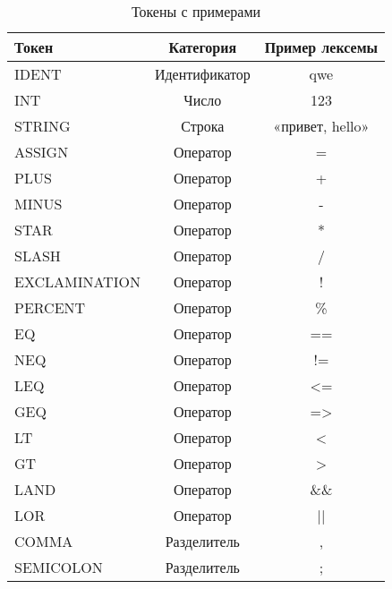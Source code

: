 \begin{table}[h!]
    \Large
    \caption{Токены с примерами}
    \label{t:tokens}
    \centering
    \begin{tabularx}{\textwidth}{|X|c|c|}
        \hline
        Токен         & Категория      & Пример лексемы  \\
        \hline
        IDENT         & Идентификатор  & qwe             \\
        \hline
        INT           & Число          & 123             \\
        \hline
        STRING        & Строка         & «привет, hello» \\
        \hline
        ASSIGN        & Оператор       & =               \\
        \hline
        PLUS          & Оператор       & +               \\
        \hline
        MINUS         & Оператор       & -               \\
        \hline
        STAR          & Оператор       & *               \\
        \hline
        SLASH         & Оператор       & /               \\
        \hline
        EXCLAMINATION & Оператор       & !               \\
        \hline
        PERCENT       & Оператор       & \%              \\
        \hline
        EQ            & Оператор       & ==              \\
        \hline
        NEQ           & Оператор       & !=              \\
        \hline
        LEQ           & Оператор       & <=              \\
        \hline
        GEQ           & Оператор       & =>              \\
        \hline
        LT            & Оператор       & <               \\
        \hline
        GT            & Оператор       & >               \\
        \hline
        LAND          & Оператор       & \&\&            \\
        \hline
        LOR           & Оператор       & ||              \\
        \hline
        COMMA         & Разделитель    & ,               \\
        \hline
        SEMICOLON     & Разделитель    & ;               \\

\end{tabularx}
\end{table}
